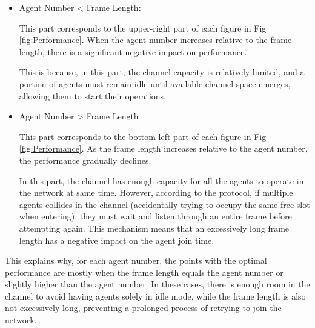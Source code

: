 \begin{itemize}
    \item Agent Number < Frame Length:
    
    This part corresponds to the upper-right part of each figure in  Fig \ref{fig:Performance}. 
    When the agent number increases relative to the frame length, there is a significant negative impact on performance.
    
    This is because, in this part, the channel capacity is relatively limited, and a portion of agents must remain idle until available channel space emerges, allowing them to start their operations.
    
    \item Agent Number > Frame Length
    
    This part corresponds to the bottom-left part of each figure in Fig \ref{fig:Performance}. 
    As the frame length increases relative to the agent number, the performance gradually declines.
   

    In this part, the channel has enough capacity for all the agents to operate in the network at same time. 
    However, according to the protocol, if multiple agents collides in the channel (accidentally trying to occupy the same free slot when entering), they must wait and listen through an entire frame before attempting again. This mechanism means that an excessively long frame length has a negative impact on the agent join time.

\end{itemize}


This explains why, for each agent number, the points with the optimal performance are mostly when the frame length equals the agent number or slightly higher than the agent number. In these cases, there is enough room in the channel to avoid having agents solely in idle mode, while the frame length is also not excessively long, preventing a prolonged process of retrying to join the network.


